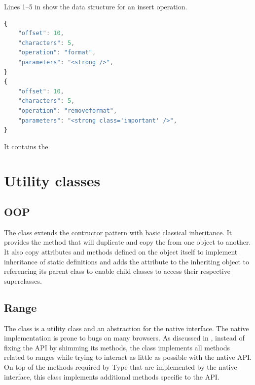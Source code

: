 Lines 1--5 in  show the data structure for an insert operation.

\begin{lstlisting}[language=JavaScript, caption={Change data structure}, label=lst:format_structure]
{
    "offset": 10,
    "characters": 5,
    "operation": "format",
    "parameters": "<strong />",
}
{
    "offset": 10,
    "characters": 5,
    "operation": "removeformat",
    "parameters": "<strong class='important' />",
}
\end{lstlisting}

It contains the 


\section{Utility classes}

\subsection{OOP}
\label{sec:oop_class}

The  class extends the contructor pattern with basic classical inheritance. It provides the method  that will duplicate and copy the  from one  object to another. It also copy attributes and methods defined on the  object itself to implement inheritance of static definitions and adds the attribute  to the inheriting  object to referencing its parent class to enable child classes to access their respective superclasses.




\subsection{Range}

The  class is a utility class and an abstraction for the native  interface. The native implementation is prone to bugs on many browsers. As discussed in , instead of fixing the API by shimming its methods, the  class implements all methods related to ranges while trying to interact as little as possible with the native API. On top of the methods required by Type that are implemented by the native  interface, this class implements additional methods specific to the API.

